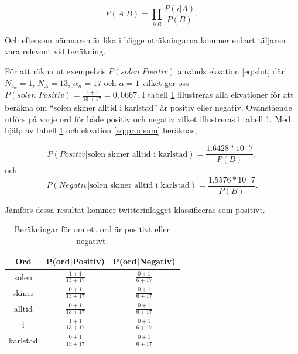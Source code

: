 \documentclass{kaumasters} %
\begin{document}
\begin{equation}\label{eq:prodsum}
P(A|B) = \prod\limits_{i \epsilon B} \frac{P(i|A)}{P(B)},
\end{equation}

Och eftersom nämnaren är lika i bägge uträkningarna kommer enbart täljaren vara relevant vid beräkning.

För att räkna ut exempelvis $P(solen|Positiv)$ används ekvation \ref{eq:slut} där $N_{b_w} = 1$, $N_A= 13$, $\alpha_n = 17$ och $\alpha = 1$ vilket ger oss $P(solen|Positiv) =  \frac{1 + 1}{13 + 17} = 0,0667$. I tabell \ref{tab:ekv} illustreras alla ekvationer för att beräkna om “solen skiner alltid i karlstad” är positiv eller negativ. Ovanstående utförs på varje ord för både positiv och negativ vilket illustreras i tabell \ref{tab:ekv}.  Med hjälp av tabell \ref{tab:ekv} och ekvation \ref{eq:prodsum} beräknas, 

\begin{equation}
P(Positiv|\textrm{solen skiner alltid i karlstad}) = \frac{1.6428 * 10^-7}{P(B)},
\end{equation}
och
\begin{equation}
P(Negativ|\textrm{solen skiner alltid i karlstad}) =  \frac{1.5576 * 10^-7}{P(B)}.
\end{equation}

Jämförs dessa resultat kommer twitterinlägget klassificeras som positivt.

\begin{table}[H]
\centering
\caption{Beräkningar för om ett ord är positivt eller negativt.}
\label{tab:ekv}
    \begin{tabular}{ccc}
    \toprule
    \textbf{Ord} & \textbf{P(ord|Positiv)} & \textbf{P(ord|Negativ)} \\
    \midrule
    solen & $\frac{1 + 1}{13 + 17} $ & $\frac{0 + 1}{6 + 17} $\\
    skiner & $\frac{0 + 1}{13 + 17} $ & $\frac{0 + 1}{6 + 17}$ \\
    alltid & $\frac{0 + 1}{13 + 17}$ & $\frac{0 + 1}{6 + 17}$ \\
    i & $\frac{1 + 1}{13 + 17} $& $\frac{0 + 1}{6 + 17}$ \\
karlstad & $\frac{0 + 1}{13 + 17}$ & $\frac{0 + 1}{6 + 17}$ \\
    \bottomrule
\end{tabular}
\end{table}
\end{document}
